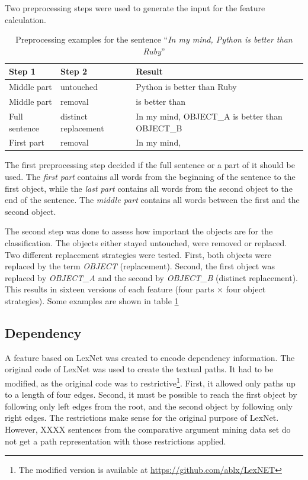 Two preprocessing steps were used to generate the input for the feature calculation.

\begin{table}[ht]
\centering

\caption{Preprocessing examples for the sentence \enquote{\emph{In my mind, Python is better than Ruby}}}
\label{preprocessing_example}
\begin{tabularx}{\linewidth}{llX}
\toprule
Step 1 & Step 2 & Result \\ \midrule
Middle part & untouched & Python is better than Ruby \\
Middle part & removal & is better than \\
Full sentence & distinct replacement &In my mind, OBJECT\_A is better than OBJECT\_B \\
First part & removal & In my mind, \\
\bottomrule
\end{tabularx}

\end{table}

The first preprocessing step decided if the full sentence or a part of it should be used. The \emph{first part} contains all words from the beginning of the sentence to the first object, while the \emph{last part} contains all words from the second object to the end of the sentence. The \emph{middle part} contains all words between the first and the second object.

The second step was done to assess how important the objects are for the classification. The objects either stayed untouched, were removed or replaced. Two different replacement strategies were tested. First, both objects were replaced by the term \emph{OBJECT} (replacement). Second, the first object was replaced by \emph{OBJECT\_A} and the second by \emph{OBJECT\_B} (distinct replacement). This results in sixteen versions of each feature (four parts $\times$ four object strategies). Some examples are shown in table \ref{preprocessing_example}

\subsection{Dependency}
A feature based on LexNet was created to encode dependency information. The original code of LexNet was used to create the textual paths. It had to be modified, as the original code was to restrictive\footnote{The modified version is available at \url{https://github.com/ablx/LexNET}}. First, it allowed only paths up to a length of four edges. Second, it must be possible to reach the first object by following only left edges from the root, and the second object by following only right edges. The restrictions make sense for the original purpose of LexNet. However, XXXX sentences from the comparative argument mining data set do not get a path representation with those restrictions applied.



